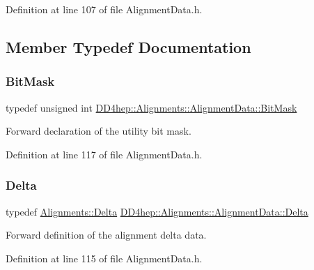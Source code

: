 Definition at line 107 of file Alignment\+Data.\+h.



\subsection{Member Typedef Documentation}
\hypertarget{class_d_d4hep_1_1_alignments_1_1_alignment_data_ab5c31f7e5512ca675be8323bc723b123}{}\label{class_d_d4hep_1_1_alignments_1_1_alignment_data_ab5c31f7e5512ca675be8323bc723b123} 
\subsubsection{\texorpdfstring{Bit\+Mask}{BitMask}}
{\footnotesize\ttfamily typedef unsigned int \hyperlink{class_d_d4hep_1_1_alignments_1_1_alignment_data_ab5c31f7e5512ca675be8323bc723b123}{D\+D4hep\+::\+Alignments\+::\+Alignment\+Data\+::\+Bit\+Mask}}



Forward declaration of the utility bit mask. 



Definition at line 117 of file Alignment\+Data.\+h.

\hypertarget{class_d_d4hep_1_1_alignments_1_1_alignment_data_a3e67a5cbb3449006e9552b0f7bd98d45}{}\label{class_d_d4hep_1_1_alignments_1_1_alignment_data_a3e67a5cbb3449006e9552b0f7bd98d45} 
\subsubsection{\texorpdfstring{Delta}{Delta}}
{\footnotesize\ttfamily typedef \hyperlink{class_d_d4hep_1_1_alignments_1_1_delta}{Alignments\+::\+Delta} \hyperlink{class_d_d4hep_1_1_alignments_1_1_alignment_data_a3e67a5cbb3449006e9552b0f7bd98d45}{D\+D4hep\+::\+Alignments\+::\+Alignment\+Data\+::\+Delta}}



Forward definition of the alignment delta data. 



Definition at line 115 of file Alignment\+Data.\+h.

